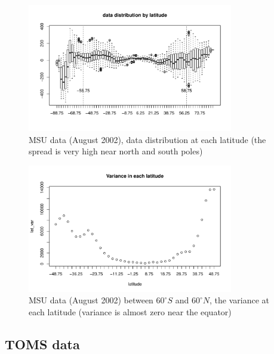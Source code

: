 
\begin{figure}[H]
\label{MSU_data_latitude}
\centering
\includegraphics [width=0.8\textwidth, keepaspectratio]{graphs/MSU_data_latitude.pdf}
\caption{MSU data (August 2002), data distribution at each latitude (the spread is very high near north and south poles)}
\end{figure}

\begin{figure}[H]
\centering
\includegraphics [width=0.8\textwidth, keepaspectratio]{graphs/MSU_data_var_lat.pdf}
\caption{MSU data (August 2002) between $60^\circ S$ and $60^\circ N$, the variance at each latitude (variance is almost zero near the equator)}
\label{MSU_data_var_lat}
\end{figure}

\newpage
\subsection{TOMS data}

